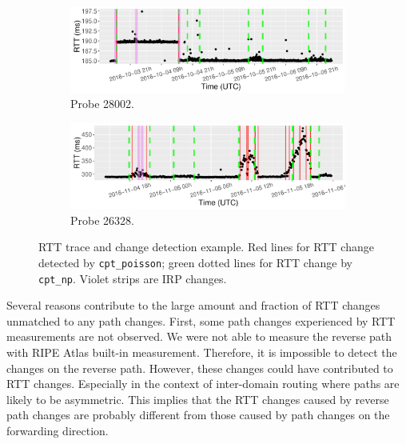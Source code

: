 \begin{figure}[!htb]
    \centering
    \begin{subfigure}[b]{.96\textwidth}
	\centering
	\includegraphics[width=\textwidth]{gfx/chap4/case_28002.pdf}
	\caption{\footnotesize Probe 28002.}
	\label{fig:case_28002}
	\end{subfigure}
	\begin{subfigure}[b]{.96\textwidth}
	\centering
	\includegraphics[width=\textwidth]{gfx/chap4/case_26328.pdf}
	\caption{\footnotesize Probe 26328.}
	\label{fig:case_26328}
	\end{subfigure}
\caption{RTT trace and change detection example. Red lines for RTT change detected by \texttt{cpt\_poisson}; green dotted lines for RTT change by \texttt{cpt\_np}. Violet strips are IRP changes.}
\label{fig:case_sensitivity}
\end{figure}

Several reasons contribute to the large amount and fraction of RTT changes unmatched to any path changes.
First, some path changes experienced by RTT measurements are not observed. We were not able to measure the reverse path with RIPE Atlas built-in measurement.
Therefore, it is impossible to detect the changes on the reverse path. 
However, these changes could have contributed to RTT changes. 
Especially in the context of inter-domain routing where paths are likely to be asymmetric.
This implies that the RTT changes caused by reverse path changes are probably different from those caused by path changes on the forwarding direction.

